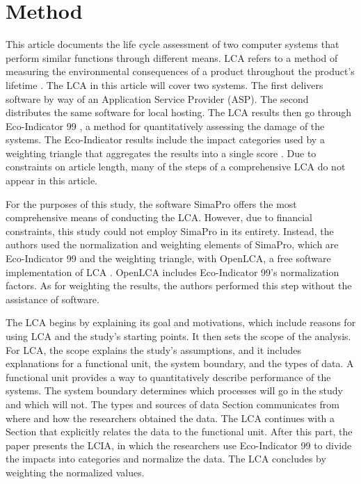 \documentclass[final,journal,10pt,letterpaper,oneside,twocolumn,compsoc]%
{IEEEtran}
\begin{document}
\section{Method}
This article documents the life cycle assessment of two computer systems
that perform similar functions through different means. LCA refers to a method
of measuring the environmental consequences of a product throughout the
product's
lifetime \cite{14040} \cite{14044}. The LCA in this article will cover two
systems. The first
delivers software by way of an Application Service Provider (ASP). The
second distributes the same software for local hosting. The LCA results then go
through Eco-Indicator 99 \cite{pre}, a method for quantitatively assessing the
damage of the systems. The Eco-Indicator
results include the impact categories used by a weighting triangle that
aggregates the results into a single score \cite{triangle}. Due to constraints
on article length, many of the steps of a comprehensive LCA do not appear in
this article.

For the purposes of this study, the software SimaPro offers the most
comprehensive means of conducting the LCA.
However, due to financial constraints, this study could not employ SimaPro in
its entirety. Instead,
the authors used the normalization and weighting elements of SimaPro, which are
Eco-Indicator 99
and the weighting triangle, with OpenLCA, a free software implementation of LCA
\cite{openlca}. OpenLCA includes Eco-Indicator 99's normalization factors. As
for weighting the results, the
authors performed this step without the assistance of software.

The LCA begins by explaining its goal and motivations, which include reasons for
using LCA and the study's starting points. It then sets the scope of
the analysis. For LCA, the scope explains the study's assumptions, and it
includes explanations for a functional unit,
the system boundary, and the types of data. A functional unit provides a way to
quantitatively describe performance of the systems. The system boundary
determines which processes will go in the study and which will not. The types
and sources of data Section communicates from where and how the researchers
obtained the data. The LCA continues with a Section that explicitly relates the
data to the functional unit. After this part, the paper presents the LCIA, in
which the researchers use Eco-Indicator 99 to divide the impacts into categories
and normalize the data. The LCA concludes by weighting the normalized values.
\end{document}

